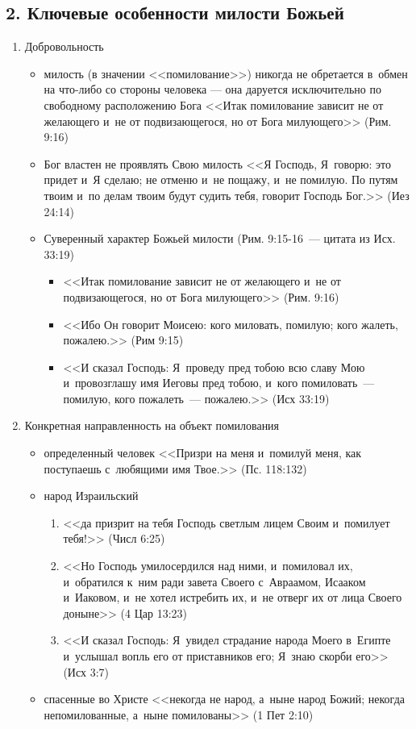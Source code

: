 \documentclass[a4paper,12pt]{article}
\begin{document}
\subsection{2. Ключевые особенности милости Божьей}
\begin{enumerate}
    \item Добровольность
    
    \begin{itemize}
        \item милость (в значении <<помилование>>) никогда не обретается в~обмен на что-либо со стороны человека — она даруется исключительно по свободному расположению Бога <<Итак помилование зависит не от желающего и~не от подвизающегося, но от Бога милующего>> (Рим. 9:16)
        \item Бог властен не проявлять Свою милость <<Я Господь, Я~говорю: это придет и~Я сделаю; не отменю и~не пощажу, и~не помилую. По путям твоим и~по делам твоим будут судить тебя, говорит Господь Бог.>> (Иез 24:14)
        \item Суверенный характер Божьей милости (Рим. 9:15-16~--- цитата из Исх. 33:19)
        \begin{itemize}
        \item <<Итак помилование зависит не от желающего и~не от подвизающегося, но от Бога милующего>> (Рим. 9:16)
        \item <<Ибо Он говорит Моисею: кого миловать, помилую; кого жалеть, пожалею.>> (Рим 9:15)
        \item <<И сказал Господь: Я~проведу пред тобою всю славу Мою и~провозглашу имя Иеговы пред тобою, и~кого помиловать~--- помилую, кого пожалеть~--- пожалею.>> (Исх 33:19)
        \end{itemize}
    \end{itemize}
    
    \item Конкретная направленность на объект помилования
    
    \begin{itemize}
        \item определенный человек  <<Призри на меня и~помилуй меня, как поступаешь с~любящими имя Твое.>> (Пс. 118:132)
        \item народ Израильский
        \begin{enumerate}
            \item <<да призрит на тебя Господь светлым лицем Своим и~помилует тебя!>> (Числ 6:25) 
            \item <<Но Господь умилосердился над ними, и~помиловал их, и~обратился к~ним ради завета Своего с~Авраамом, Исааком и~Иаковом, и~не хотел истребить их, и~не отверг их от лица Своего доныне>> (4 Цар 13:23) 
            \item <<И сказал Господь: Я~увидел страдание народа Моего в~Египте и~услышал вопль его от приставников его; Я~знаю скорби его>> (Исх 3:7)
        \end{enumerate}
        \item спасенные во Христе <<некогда не народ, а~ныне народ Божий; некогда непомилованные, а~ныне помилованы>> (1 Пет 2:10)
    \end{itemize}
\end{enumerate}
\end{document}
